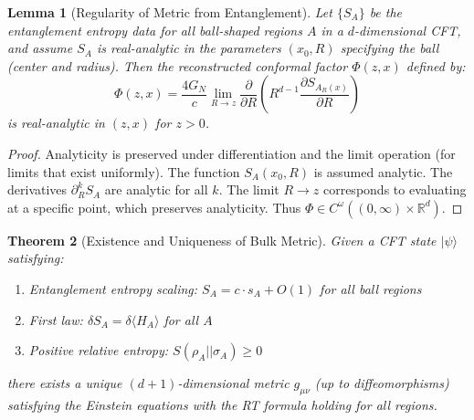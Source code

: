 \documentclass[12pt,a4paper]{article}
\newtheorem{theorem}{Theorem}[section]
\newtheorem{lemma}[theorem]{Lemma}
\begin{document}
\begin{lemma}[Regularity of Metric from Entanglement]\label{lem:metric-regularity}
Let $\{S_A\}$ be the entanglement entropy data for all ball-shaped regions $A$ in a $d$-dimensional CFT, and assume $S_A$ is real-analytic in the parameters $(x_0, R)$ specifying the ball (center and radius). Then the reconstructed conformal factor $\Phi(z,x)$ defined by:
\begin{equation}
\Phi(z, x) = \frac{4G_N}{c} \lim_{R \to z} \frac{\partial}{\partial R}\left( R^{d-1} \frac{\partial S_{A_R(x)}}{\partial R} \right)
\end{equation}
is real-analytic in $(z, x)$ for $z > 0$.
\end{lemma}

\begin{proof}
Analyticity is preserved under differentiation and the limit operation (for limits that exist uniformly). The function $S_A(x_0, R)$ is assumed analytic. The derivatives $\partial_R^k S_A$ are analytic for all $k$. The limit $R \to z$ corresponds to evaluating at a specific point, which preserves analyticity. Thus $\Phi \in C^\omega((0,\infty) \times \mathbb{R}^d)$.
\end{proof}

\begin{theorem}[Existence and Uniqueness of Bulk Metric]\label{thm:existence-uniqueness}\label{thm:bulk-metric}
Given a CFT state $|\psi\rangle$ satisfying:
\begin{enumerate}
    \item Entanglement entropy scaling: $S_A = c \cdot s_A + O(1)$ for all ball regions
    \item First law: $\delta S_A = \delta\langle H_A\rangle$ for all $A$
    \item Positive relative entropy: $S(\rho_A || \sigma_A) \geq 0$
\end{enumerate}
there exists a unique $(d+1)$-dimensional metric $g_{\mu\nu}$ (up to diffeomorphisms) satisfying the Einstein equations with the RT formula holding for all regions.
\end{theorem}
\end{document}
